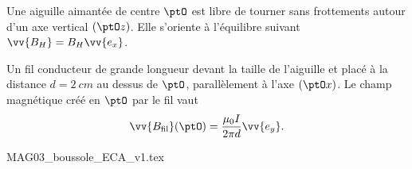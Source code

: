 
\finEntrainement


\minusMedskip



\hauteurLargeurCadreReponse		{7mm}{2cm}
\initialisationEntrainement


                                \initialisationPartieGauche %
Une aiguille aimantée de centre $\ptO$ est libre de tourner sans frottements autour d'un axe vertical $(\ptO z)$. Elle s'oriente à l'équilibre suivant $\vv{B_H} = B_H \vv{e_x}$.%

Un fil conducteur de grande longueur devant la taille de l'aiguille et placé à la distance $d = \SI{2}{cm}$ au dessus de $\ptO$, parallèlement à l'axe $(\ptO x)$.
Le champ magnétique créé en $\ptO$ par le fil vaut  
\[
\vv{B_{\text{fil}}}(\ptO)=\dfrac{\mu_0 I}{2 \pi d} \vv{e_y}.
\]

                                \initialisationPartieDroite %
\begin{center}
\def\scaleImage{0.75}
{MAG03_boussole_ECA_v1.tex}
\end{center}
%
                               \finalisationDuPartageDePage %


